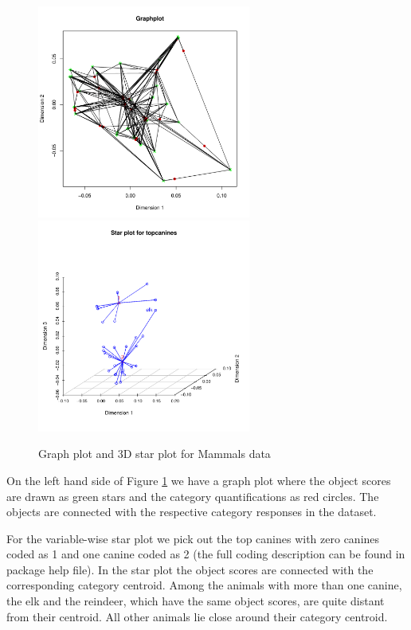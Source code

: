 \documentclass[article]{Z}
\begin{document}
\begin{figure}[hbt]
\begin{center}
\includegraphics[height=70mm, width=70mm]{mammalsgraph.pdf}
\includegraphics[height=70mm, width=70mm]{mammalsstar.pdf}
\caption{\label{fig:mamm} Graph plot and 3D star plot for Mammals data}
\end{center}
\end{figure}

On the left hand side of Figure \ref{fig:mamm} we have a graph plot where the object scores are drawn as green stars and the category quantifications as 
red circles. The objects are connected with the respective category responses in the dataset.

For the variable-wise star plot we pick out the top canines with zero canines coded as 1 and one canine coded as 2 (the full coding description can be found in package help file). In the star plot the object scores are connected with the corresponding category centroid. Among the animals with more than one canine, the elk and the reindeer, which have the same object scores, are quite distant from their centroid. All other animals lie close around their category centroid.
\end{document}
